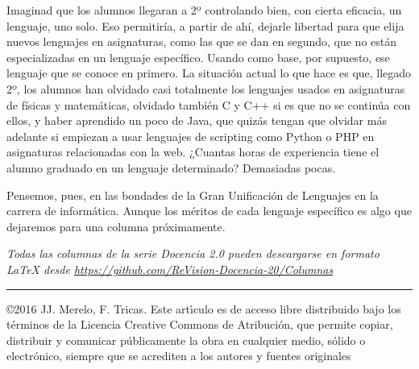 \documentclass[twoside,10pt]{article}
\newcommand{\surl}[1]{{\small\url{#1}}}
\begin{document}
\begin{multicols}{2}
Imaginad que los alumnos llegaran a 2º controlando bien, con cierta
eficacia, un lenguaje, uno solo. Eso permitiría, a partir de ahí,
dejarle libertad para que elija nuevos lenguajes en asignaturas, como
las que se dan en segundo, que no están especializadas en un lenguaje
específico. Usando como base, por supuesto, ese lenguaje que se conoce
en primero. La situación actual lo que hace es que, llegado 2º, los
alumnos han olvidado casi totalmente los lenguajes usados en
asignaturas de físicas y matemáticas, olvidado también C y C++ si es
que no se continúa con ellos, y haber aprendido un poco de Java, que
quizás tengan que olvidar más adelante si empiezan a usar lenguajes de
scripting como Python o PHP en asignaturas relacionadas con la
web. ¿Cuantas horas de experiencia tiene el alumno graduado en un
lenguaje determinado? Demasiadas pocas.

Pensemos, pues, en las bondades de la Gran Unificación de Lenguajes en
la carrera de informática. Aunque los méritos de cada lenguaje
específico es algo que dejaremos para una columna próximamente. 

\noindent  
\bigskip

\noindent\emph{Todas las columnas de la serie Docencia 2.0
pueden descargarse en formato LaTeX desde
\surl{https://github.com/ReVision-Docencia-20/Columnas}}

\noindent\rule{90mm}{1pt}

{\small \noindent\copyright 2016 JJ. Merelo, F. Tricas. Este art\'{\i}culo es de acceso libre distribuido bajo los t\'{e}rminos
de la Licencia Creative Commons de Atribuci\'{o}n, que permite copiar,
distribuir y comunicar p\'{u}blicamente la obra en cualquier medio, s\'{o}lido
o electr\'{o}nico, siempre que se acrediten a los autores y fuentes
originales}

\end{multicols}
\end{document}
